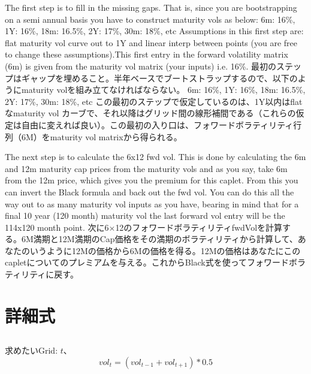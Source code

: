 \documentclass[platex]{jsarticle}
\numberwithin{equation}{section}
\begin{document}
The first step is to fill in the missing gaps. That is, since you are bootstrapping on a semi annual basis you have to construct maturity vols as below:
6m: 16\%, 1Y: 16\%, 18m: 16.5\%, 2Y: 17\%, 30m: 18\%, etc
Assumptions in this first step are: flat maturity vol curve out to 1Y and linear interp between points (you are free to change these assumptions).This first entry in the forward volatility matrix (6m) is given from the maturity vol matrix (your inputs) i.e. 16\%.
\fi
最初のステップはギャップを埋めること。半年ベースでブートストラップするので、以下のようにmaturity volを組み立てなければならない。
6m: 16\%, 1Y: 16\%, 18m: 16.5\%, 2Y: 17\%, 30m: 18\%, etc
この最初のステップで仮定しているのは、1Y以内はflatなmaturity vol カーブで、それ以降はグリッド間の線形補間である（これらの仮定は自由に変えれば良い）。この最初の入り口は、フォワードボラティリティ行列（6M）をmaturity vol matrixから得られる。


The next step is to calculate the 6x12 fwd vol. This is done by calculating the 6m and 12m maturity cap prices from the maturity vols and as you say, take 6m from the 12m price, which gives you the premium for this caplet. From this you can invert the Black formula and back out the fwd vol. You can do this all the way out to as many maturity vol inputs as you have, bearing in mind that for a final 10 year (120 month) maturity vol the last forward vol entry will be the 114x120 month point.
\fi
次に6$\times$12のフォワードボラティリティfwdVolを計算する。6M満期と12M満期のCap価格をその満期のボラティリティから計算して、あなたのいうように12Mの価格から6Mの価格を得る。12Mの価格はあなたにこのcapletについてのプレミアムを与える。これからBlack式を使ってフォワードボラティリティに戻す。


\section{詳細式}
\subsection{}
求めたいGrid: $t$、
\[
vol_t = (vol_{t-1} + vol_{t+1}) * 0.5
\]
\end{document}
